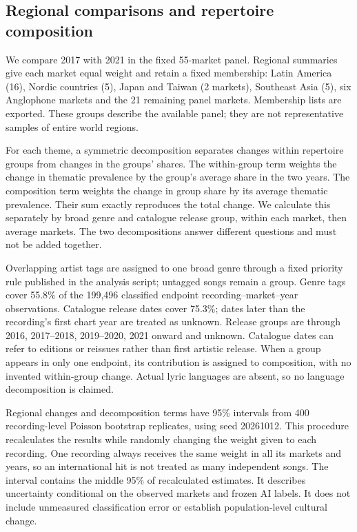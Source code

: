 \subsection{Regional comparisons and repertoire composition}
We compare 2017 with 2021 in the fixed 55-market panel. Regional summaries give each market equal weight and retain a fixed membership: Latin America (16), Nordic countries (5), Japan and Taiwan (2 markets), Southeast Asia (5), six Anglophone markets and the 21 remaining panel markets. Membership lists are exported. These groups describe the available panel; they are not representative samples of entire world regions.

For each theme, a symmetric decomposition separates changes within repertoire groups from changes in the groups' shares. The within-group term weights the change in thematic prevalence by the group's average share in the two years. The composition term weights the change in group share by its average thematic prevalence. Their sum exactly reproduces the total change. We calculate this separately by broad genre and catalogue release group, within each market, then average markets. The two decompositions answer different questions and must not be added together.

Overlapping artist tags are assigned to one broad genre through a fixed priority rule published in the analysis script; untagged songs remain a group. Genre tags cover 55.8\% of the 199,496 classified endpoint recording--market--year observations. Catalogue release dates cover 75.3\%; dates later than the recording's first chart year are treated as unknown. Release groups are through 2016, 2017--2018, 2019--2020, 2021 onward and unknown. Catalogue dates can refer to editions or reissues rather than first artistic release. When a group appears in only one endpoint, its contribution is assigned to composition, with no invented within-group change. Actual lyric languages are absent, so no language decomposition is claimed.

Regional changes and decomposition terms have 95\% intervals from 400 recording-level Poisson bootstrap replicates, using seed 20261012. This procedure recalculates the results while randomly changing the weight given to each recording. One recording always receives the same weight in all its markets and years, so an international hit is not treated as many independent songs. The interval contains the middle 95\% of recalculated estimates. It describes uncertainty conditional on the observed markets and frozen AI labels. It does not include unmeasured classification error or establish population-level cultural change.

